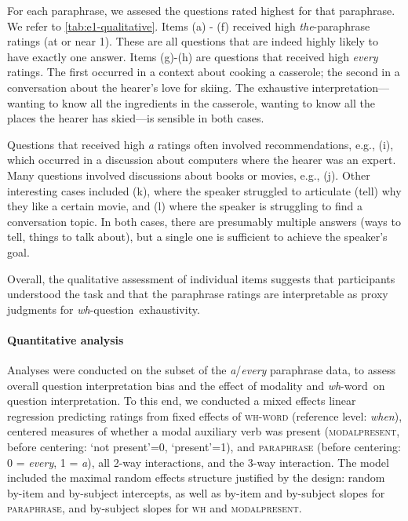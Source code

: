 \documentclass[12pt,letterpaper,table,svgnames,dvipsnames]{article}
\newcommand{\whq}{\emph{wh}-question~}
\newcommand{\whw}{\emph{wh}-word~}
\begin{document}
For each paraphrase, we assesed the questions rated highest for that paraphrase. We refer to \ref{tab:e1-qualitative}. Items (a) - (f) received high \emph{the}-paraphrase ratings (at or near 1). These are all questions that are indeed highly likely to have exactly one answer. 
Items (g)-(h) are questions that received high \emph{every} ratings. The first occurred in a context about cooking a casserole; the second in a conversation about the hearer's love for skiing. The exhaustive interpretation---wanting to know all the ingredients in the casserole, wanting to know all the places the hearer has skied---is sensible in both cases.

Questions that received high \emph{a} ratings often involved recommendations, e.g., (i), which occurred in a discussion about computers where the hearer was an expert. Many questions involved discussions about books or movies, e.g., (j). Other interesting cases included (k), where the speaker struggled to articulate (tell) why they like a certain movie, and (l) where the speaker is struggling to find a conversation topic. In both cases, there are presumably multiple answers (ways to tell, things to talk about), but a single one is sufficient to achieve the speaker's goal.

Overall, the qualitative assessment of individual items suggests that participants understood the task and that the paraphrase ratings are interpretable as proxy judgments for \whq exhaustivity.

\paragraph{Quantitative analysis}

Analyses were conducted on the subset of the \emph{a}/\emph{every} paraphrase data, to assess overall question interpretation bias and the effect of modality and \whw on question interpretation. To this end, we conducted a mixed effects linear regression predicting ratings from fixed effects of \textsc{wh-word} (reference level: \emph{when}), centered measures of whether a modal auxiliary verb was present (\textsc{modalpresent}, before centering: `not present'=0, `present'=1), and \textsc{paraphrase} (before centering: 0 = \emph{every}, 1 = \emph{a}), all 2-way interactions, and the 3-way interaction. The model included the maximal random effects structure justified by the design: random by-item and by-subject intercepts, as well as by-item and by-subject slopes for \textsc{paraphrase}, and by-subject slopes for \textsc{wh} and \textsc{modalpresent}. 
\end{document}
